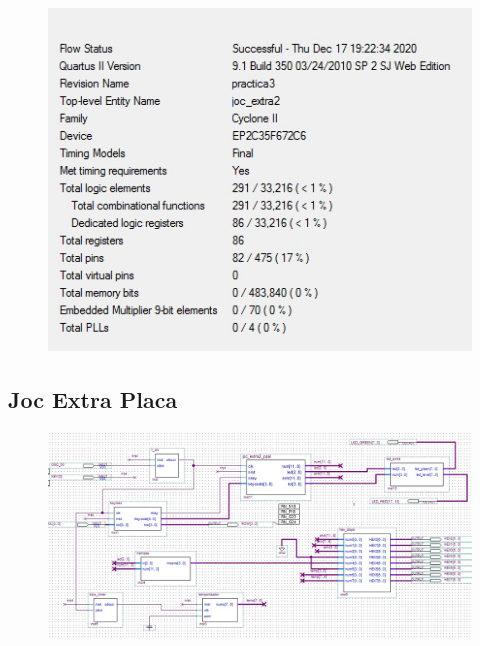 \documentclass[12pt, a4papre]{article}
\begin{document}
	
	\begin{figure}[H]
	
				\begin{center}
		\includegraphics[width=130mm]{informeJocExtra.jpeg}
		\end{center}
	\end{figure}
	

\subsection{Joc Extra Placa}

	\begin{figure}[H]
	
				\begin{center}
		\includegraphics[width=130mm]{JocExtraPlaca.jpeg}
		\end{center}
	\end{figure}
	
	
\end{document}
